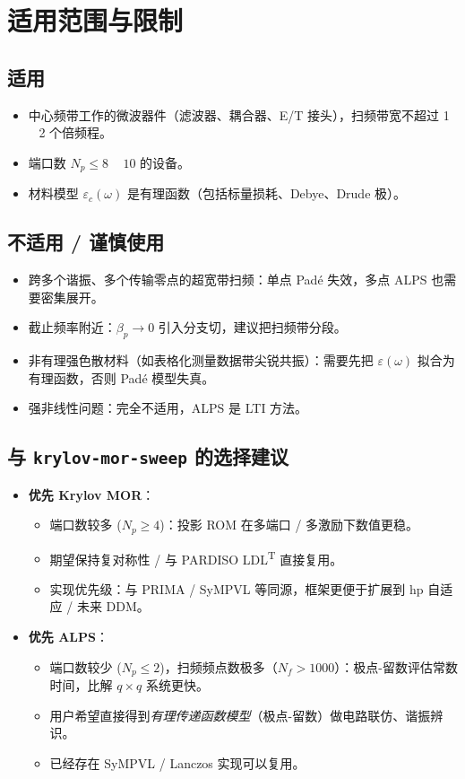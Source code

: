 \documentclass[11pt,a4paper]{ctexart}
\begin{document}
\section{适用范围与限制}

\subsection{适用}

\begin{itemize}
\item 中心频带工作的微波器件（滤波器、耦合器、E/T 接头），扫频带宽不超过 1 ~ 2 个倍频程。
\item 端口数 $N_p \le 8$ ~ $10$ 的设备。
\item 材料模型 $\varepsilon_c(\omega)$ 是有理函数（包括标量损耗、Debye、Drude 极）。
\end{itemize}

\subsection{不适用 / 谨慎使用}

\begin{itemize}
\item 跨多个谐振、多个传输零点的超宽带扫频：单点 Padé 失效，多点 ALPS 也需要密集展开。
\item 截止频率附近：$\beta_p\to 0$ 引入分支切，建议把扫频带分段。
\item 非有理强色散材料（如表格化测量数据带尖锐共振）：需要先把 $\varepsilon(\omega)$ 拟合为有理函数，否则 Padé 模型失真。
\item 强非线性问题：完全不适用，ALPS 是 LTI 方法。
\end{itemize}

\subsection{与 \texttt{krylov-mor-sweep} 的选择建议}

\begin{itemize}
\item \textbf{优先 Krylov MOR}：
  \begin{itemize}
  \item 端口数较多 ($N_p \ge 4$)：投影 ROM 在多端口 / 多激励下数值更稳。
  \item 期望保持复对称性 / 与 PARDISO LDL\textsuperscript{T} 直接复用。
  \item 实现优先级：与 PRIMA / SyMPVL 等同源，框架更便于扩展到 hp 自适应 / 未来 DDM。
  \end{itemize}
\item \textbf{优先 ALPS}：
  \begin{itemize}
  \item 端口数较少 ($N_p \le 2$)，扫频频点数极多（$N_f > 1000$）：极点-留数评估常数时间，比解 $q\times q$ 系统更快。
  \item 用户希望直接得到\emph{有理传递函数模型}（极点-留数）做电路联仿、谐振辨识。
  \item 已经存在 SyMPVL / Lanczos 实现可以复用。
  \end{itemize}
\end{itemize}
\end{document}
